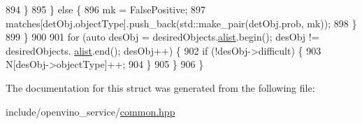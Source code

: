 \begin{DoxyCode}
894                 \}
895             \} \textcolor{keywordflow}{else} \{
896                 mk = FalsePositive;
897                 matches[detObj.objectType].push\_back(std::make\_pair(detObj.prob, mk));
898             \}
899         \}
900 
901         \textcolor{keywordflow}{for} (\textcolor{keyword}{auto} desObj = desiredObjects.\hyperlink{classImageDescription_aa814580e2dd58fc3442ddd3549e6d81d}{alist}.begin(); desObj != desiredObjects.
      \hyperlink{classImageDescription_aa814580e2dd58fc3442ddd3549e6d81d}{alist}.end(); desObj++) \{
902             \textcolor{keywordflow}{if} (!desObj->difficult) \{
903                 N[desObj->objectType]++;
904                 \}
905             \}
906         \}
\end{DoxyCode}


The documentation for this struct was generated from the following file\+:\begin{DoxyCompactItemize}
\item 
include/openvino\+\_\+service/\hyperlink{common_8hpp}{common.\+hpp}\end{DoxyCompactItemize}
